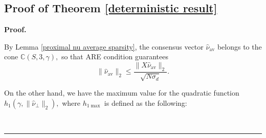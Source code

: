 \documentclass{article}
\theoremstyle{break}
\newenvironment{proof}[1][Proof]{\noindent\textbf{#1.} }{\ \rule{0.5em}{0.5em}}
\begin{document}
\subsection{Proof of Theorem \ref{deterministic result}}

\begin{proof}

 By Lemma \ref{proximal nu average sparsity}, the consensus vector $\hat{\nu}_{\text{av}}$ belongs to the cone $\mathbb{C}(S,3,\gamma),$ so that ARE condition guarantees 
 \begin{equation}
     \lVert\hat{\nu}_{\text{av}}\rVert_2\leq\frac{\lVert X\hat{\nu}_{\text{av}}\rVert_2}{\sqrt{N\sigma_d}}.
\end{equation}
 
 On the other hand, we have the maximum value for the quadratic function $h_1(\gamma,\lVert\hat{\nu}_{\perp}\rVert_2),$
where $h_{1\max}$ is defined as the following:





\end{proof}
\end{document}
